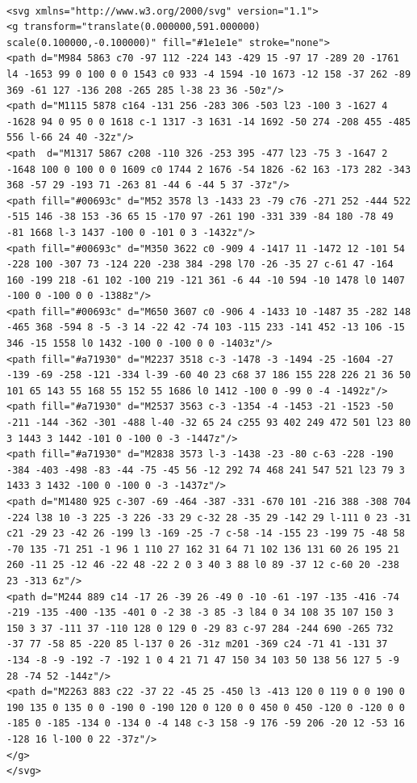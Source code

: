 \lstset{language=JavaScript}
\begin{lstlisting}[label={lst:logoaghsvg},caption={Logo AGH w zapisie SVG.}]

<svg xmlns="http://www.w3.org/2000/svg" version="1.1">
<g transform="translate(0.000000,591.000000) scale(0.100000,-0.100000)" fill="#1e1e1e" stroke="none">
<path d="M984 5863 c70 -97 112 -224 143 -429 15 -97 17 -289 20 -1761 l4 -1653 99 0 100 0 0 1543 c0 933 -4 1594 -10 1673 -12 158 -37 262 -89 369 -61 127 -136 208 -265 285 l-38 23 36 -50z"/>
<path d="M1115 5878 c164 -131 256 -283 306 -503 l23 -100 3 -1627 4 -1628 94 0 95 0 0 1618 c-1 1317 -3 1631 -14 1692 -50 274 -208 455 -485 556 l-66 24 40 -32z"/>
<path  d="M1317 5867 c208 -110 326 -253 395 -477 l23 -75 3 -1647 2 -1648 100 0 100 0 0 1609 c0 1744 2 1676 -54 1826 -62 163 -173 282 -343 368 -57 29 -193 71 -263 81 -44 6 -44 5 37 -37z"/>
<path fill="#00693c" d="M52 3578 l3 -1433 23 -79 c76 -271 252 -444 522 -515 146 -38 153 -36 65 15 -170 97 -261 190 -331 339 -84 180 -78 49 -81 1668 l-3 1437 -100 0 -101 0 3 -1432z"/>
<path fill="#00693c" d="M350 3622 c0 -909 4 -1417 11 -1472 12 -101 54 -228 100 -307 73 -124 220 -238 384 -298 l70 -26 -35 27 c-61 47 -164 160 -199 218 -61 102 -100 219 -121 361 -6 44 -10 594 -10 1478 l0 1407 -100 0 -100 0 0 -1388z"/>
<path fill="#00693c" d="M650 3607 c0 -906 4 -1433 10 -1487 35 -282 148 -465 368 -594 8 -5 -3 14 -22 42 -74 103 -115 233 -141 452 -13 106 -15 346 -15 1558 l0 1432 -100 0 -100 0 0 -1403z"/>
<path fill="#a71930" d="M2237 3518 c-3 -1478 -3 -1494 -25 -1604 -27 -139 -69 -258 -121 -334 l-39 -60 40 23 c68 37 186 155 228 226 21 36 50 101 65 143 55 168 55 152 55 1686 l0 1412 -100 0 -99 0 -4 -1492z"/>
<path fill="#a71930" d="M2537 3563 c-3 -1354 -4 -1453 -21 -1523 -50 -211 -144 -362 -301 -488 l-40 -32 65 24 c255 93 402 249 472 501 l23 80 3 1443 3 1442 -101 0 -100 0 -3 -1447z"/>
<path fill="#a71930" d="M2838 3573 l-3 -1438 -23 -80 c-63 -228 -190 -384 -403 -498 -83 -44 -75 -45 56 -12 292 74 468 241 547 521 l23 79 3 1433 3 1432 -100 0 -100 0 -3 -1437z"/>
<path d="M1480 925 c-307 -69 -464 -387 -331 -670 101 -216 388 -308 704 -224 l38 10 -3 225 -3 226 -33 29 c-32 28 -35 29 -142 29 l-111 0 23 -31 c21 -29 23 -42 26 -199 l3 -169 -25 -7 c-58 -14 -155 23 -199 75 -48 58 -70 135 -71 251 -1 96 1 110 27 162 31 64 71 102 136 131 60 26 195 21 260 -11 25 -12 46 -22 48 -22 2 0 3 40 3 88 l0 89 -37 12 c-60 20 -238 23 -313 6z"/>
<path d="M244 889 c14 -17 26 -39 26 -49 0 -10 -61 -197 -135 -416 -74 -219 -135 -400 -135 -401 0 -2 38 -3 85 -3 l84 0 34 108 35 107 150 3 150 3 37 -111 37 -110 128 0 129 0 -29 83 c-97 284 -244 690 -265 732 -37 77 -58 85 -220 85 l-137 0 26 -31z m201 -369 c24 -71 41 -131 37 -134 -8 -9 -192 -7 -192 1 0 4 21 71 47 150 34 103 50 138 56 127 5 -9 28 -74 52 -144z"/>
<path d="M2263 883 c22 -37 22 -45 25 -450 l3 -413 120 0 119 0 0 190 0 190 135 0 135 0 0 -190 0 -190 120 0 120 0 0 450 0 450 -120 0 -120 0 0 -185 0 -185 -134 0 -134 0 -4 148 c-3 158 -9 176 -59 206 -20 12 -53 16 -128 16 l-100 0 22 -37z"/>
</g>
</svg>

\end{lstlisting}

